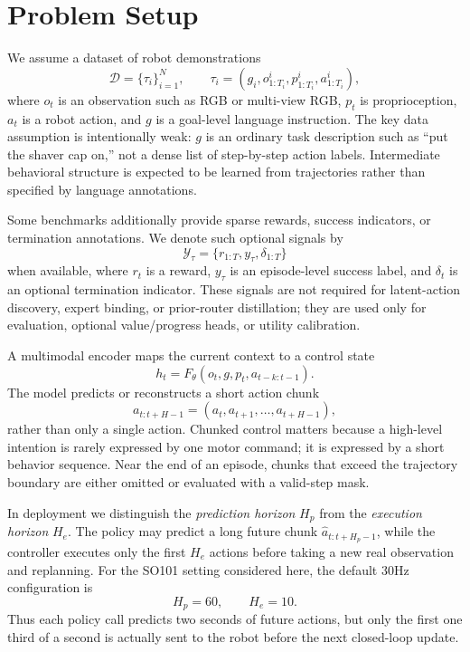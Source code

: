 \documentclass[10pt]{article}
\begin{document}
\section{Problem Setup}

We assume a dataset of robot demonstrations
\begin{equation}
\mathcal{D}=\{\tau_i\}_{i=1}^{N}, \qquad
\tau_i=(g_i,o^i_{1:T_i},p^i_{1:T_i},a^i_{1:T_i}),
\label{eq:data}
\end{equation}
where $o_t$ is an observation such as RGB or multi-view RGB, $p_t$ is proprioception, $a_t$ is a robot action, and $g$ is a goal-level language instruction. The key data assumption is intentionally weak: $g$ is an ordinary task description such as ``put the shaver cap on,'' not a dense list of step-by-step action labels. Intermediate behavioral structure is expected to be learned from trajectories rather than specified by language annotations.

Some benchmarks additionally provide sparse rewards, success indicators, or termination annotations. We denote such optional signals by
\begin{equation}
\mathcal{Y}_\tau=\{r_{1:T},y_\tau,\delta_{1:T}\}
\end{equation}
when available, where $r_t$ is a reward, $y_\tau$ is an episode-level success label, and $\delta_t$ is an optional termination indicator. These signals are not required for latent-action discovery, expert binding, or prior-router distillation; they are used only for evaluation, optional value/progress heads, or utility calibration.

A multimodal encoder maps the current context to a control state
\begin{equation}
 h_t = F_\theta(o_t,g,p_t,a_{t-k:t-1}).
 \label{eq:context}
\end{equation}
The model predicts or reconstructs a short action chunk
\begin{equation}
 a_{t:t+H-1}=(a_t,a_{t+1},\ldots,a_{t+H-1}),
 \label{eq:chunk}
\end{equation}
rather than only a single action. Chunked control matters because a high-level intention is rarely expressed by one motor command; it is expressed by a short behavior sequence. Near the end of an episode, chunks that exceed the trajectory boundary are either omitted or evaluated with a valid-step mask.

In deployment we distinguish the \emph{prediction horizon} $H_p$ from the
\emph{execution horizon} $H_e$. The policy may predict a long future chunk
$\hat{a}_{t:t+H_p-1}$, while the controller executes only the first
$H_e$ actions before taking a new real observation and replanning. For the
SO101 setting considered here, the default 30Hz configuration is
\begin{equation}
H_p=60,\qquad H_e=10.
\label{eq:hp_he}
\end{equation}
Thus each policy call predicts two seconds of future actions, but only the
first one third of a second is actually sent to the robot before the next
closed-loop update.
\end{document}
